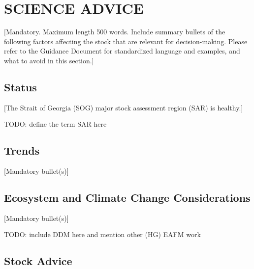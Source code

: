 \documentclass[11pt]{book}
\begin{document}
\frontmatter

\newcommand{\mli}[1]{\mathit{#1}}
\newcommand{\SB}{\mli{SB}}
\newcommand{\BR}{\mli{BR}}
\newcommand{\AVE}{\text{AVE}}

\hypertarget{science-advice}{%
\section*{SCIENCE ADVICE}\label{science-advice}}

{[}Mandatory. Maximum length 500 words. Include summary bullets of the following factors affecting the stock that are relevant for decision-making. Please refer to the Guidance Document for standardized language and examples, and what to avoid in this section.{]}

\hypertarget{status}{%
\subsection*{Status}\label{status}}

{[}The Strait of Georgia (SOG) major stock assessment region (SAR) is healthy.{]}

TODO: define the term SAR here

\hypertarget{trends}{%
\subsection*{Trends}\label{trends}}

{[}Mandatory bullet(s){]}

\hypertarget{ecosystem-and-climate-change-considerations}{%
\subsection*{Ecosystem and Climate Change Considerations}\label{ecosystem-and-climate-change-considerations}}

{[}Mandatory bullet(s){]}

TODO: include DDM here and mention other (HG) EAFM work

\hypertarget{stock-advice}{%
\subsection*{Stock Advice}\label{stock-advice}}
\end{document}
